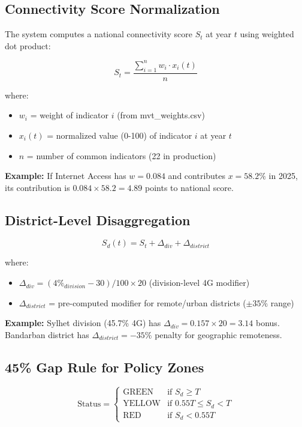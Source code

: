 \documentclass[11pt,a4paper]{article}
\begin{document}
\subsection{Connectivity Score Normalization}

The system computes a national connectivity score $S_t$ at year $t$ using weighted dot product:

$$S_t = \frac{\sum_{i=1}^{n} w_i \cdot x_i(t)}{n}$$

where:
\begin{itemize}
  \item $w_i$ = weight of indicator $i$ (from mvt\_weights.csv)
  \item $x_i(t)$ = normalized value (0-100) of indicator $i$ at year $t$
  \item $n$ = number of common indicators (22 in production)
\end{itemize}

\textbf{Example:} If Internet Access has $w=0.084$ and contributes $x=58.2\%$ in 2025, its contribution is $0.084 \times 58.2 = 4.89$ points to national score.

\subsection{District-Level Disaggregation}

$$S_d(t) = S_t + \Delta_{div} + \Delta_{district}$$

where:
\begin{itemize}
  \item $\Delta_{div} = (4\%_{division} - 30) / 100 \times 20$ (division-level 4G modifier)
  \item $\Delta_{district}$ = pre-computed modifier for remote/urban districts ($\pm 35\%$ range)
\end{itemize}

\textbf{Example:} Sylhet division (45.7\% 4G) has $\Delta_{div} = 0.157 \times 20 = 3.14$ bonus. Bandarban district has $\Delta_{district} = -35\%$ penalty for geographic remoteness.

\subsection{45\% Gap Rule for Policy Zones}

\begin{equation}
\text{Status} = \begin{cases}
\text{GREEN} & \text{if } S_d \geq T \\
\text{YELLOW} & \text{if } 0.55T \leq S_d < T \\
\text{RED} & \text{if } S_d < 0.55T
\end{cases}
\end{equation}
\end{document}
